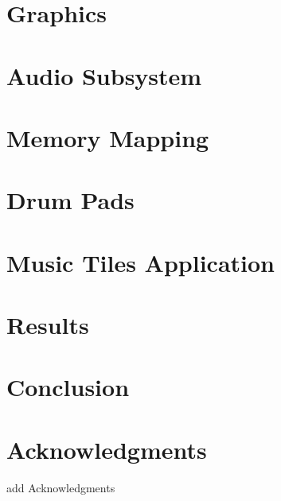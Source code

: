 \documentclass[10pt, letterpaper]{IEEEconf}
\begin{document}
  \section{Graphics}
  

  \section{Audio Subsystem}
  

  \section{Memory Mapping}
  

  \section{Drum Pads}
  

  \section{Music Tiles Application}
  

  \section{Results}
  

  \section{Conclusion}
  

  \section*{Acknowledgments}
  add Acknowledgments

  \cite{TestResource}

  \printbibliography
  
\end{document}
